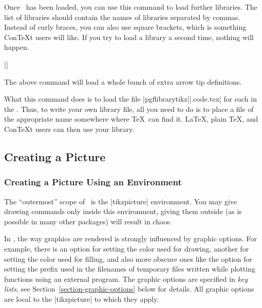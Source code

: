 \begin{command}{\usetikzlibrary{}}
  Once \tikzname\ has been loaded, you can use this command to load
  further libraries. The list of libraries should contain the names of
  libraries separated by commas. Instead of curly braces, you can also
  use square brackets, which is something Con\TeX t users will
  like. If you try to load a library a second time, nothing will
  happen. 

  \example |\usetikzlibrary{arrows}|

  The above command will load a whole bunch of extra arrow tip
  definitions.

  What this command does is to load the file
  |pgflibrarytikz||.code.tex| for each  in
  the . Thus, to write your own library file,
  all you need to do is to place a file of the appropriate name
  somewhere where \TeX\ can find it. \LaTeX, plain \TeX, and Con\TeX t
  users can then use your library.
\end{command}



\subsection{Creating a Picture}

\subsubsection{Creating a Picture Using an Environment}

The ``outermost'' scope of \tikzname\ is the |{tikzpicture}| 
environment. You may give drawing commands only inside this
environment, giving them outside (as is possible in many other
packages) will result in chaos.

In \tikzname, the way graphics are rendered is strongly influenced by
graphic options. For example, there is an option for setting the color used
for drawing, another for setting the color used for filling, and also
more obscure ones like the option  for setting the prefix used in the
filenames of temporary files written while plotting functions using an
external program. The graphic options are specified in \emph{key
  lists}, see Section~\ref{section-graphic-options} below for
details. All graphic options are local to the |{tikzpicture}| to which
they apply.  

